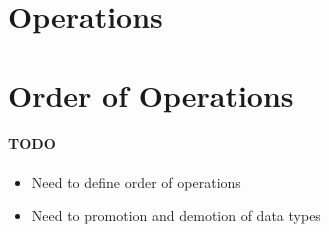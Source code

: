 \documentclass{report}
\begin{document}
	\section{Operations}
		


	\section{Order of Operations}

		\paragraph{\color{red}TODO}
			\color{red}
			\begin{itemize}
				\item Need to define order of operations
				\item Need to promotion and demotion of data types
			\end{itemize}
			\color{black}
\end{document}
